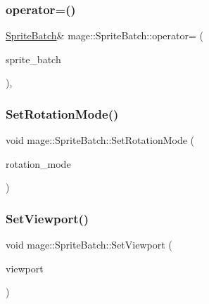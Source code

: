 \hypertarget{classmage_1_1_sprite_batch_aa2a5df588d7589a36b38b35dc8a08a48}{}\label{classmage_1_1_sprite_batch_aa2a5df588d7589a36b38b35dc8a08a48} 
\subsubsection{\texorpdfstring{operator=()}{operator=()}}
{\footnotesize\ttfamily \hyperlink{classmage_1_1_sprite_batch}{Sprite\+Batch}\& mage\+::\+Sprite\+Batch\+::operator= (\begin{DoxyParamCaption}\item[{const \hyperlink{classmage_1_1_sprite_batch}{Sprite\+Batch} \&}]{sprite\+\_\+batch }\end{DoxyParamCaption})\hspace{0.3cm}{\ttfamily [private]}, {\ttfamily [delete]}}

\hypertarget{classmage_1_1_sprite_batch_a61ab7462374d9190220629be7827ba4b}{}\label{classmage_1_1_sprite_batch_a61ab7462374d9190220629be7827ba4b} 
\subsubsection{\texorpdfstring{Set\+Rotation\+Mode()}{SetRotationMode()}}
{\footnotesize\ttfamily void mage\+::\+Sprite\+Batch\+::\+Set\+Rotation\+Mode (\begin{DoxyParamCaption}\item[{D\+X\+G\+I\+\_\+\+M\+O\+D\+E\+\_\+\+R\+O\+T\+A\+T\+I\+ON}]{rotation\+\_\+mode }\end{DoxyParamCaption})}

\hypertarget{classmage_1_1_sprite_batch_aab9eab10e3ea1c62b483a67a47d9ccdc}{}\label{classmage_1_1_sprite_batch_aab9eab10e3ea1c62b483a67a47d9ccdc} 
\subsubsection{\texorpdfstring{Set\+Viewport()}{SetViewport()}}
{\footnotesize\ttfamily void mage\+::\+Sprite\+Batch\+::\+Set\+Viewport (\begin{DoxyParamCaption}\item[{const D3\+D11\+\_\+\+V\+I\+E\+W\+P\+O\+RT \&}]{viewport }\end{DoxyParamCaption})}



